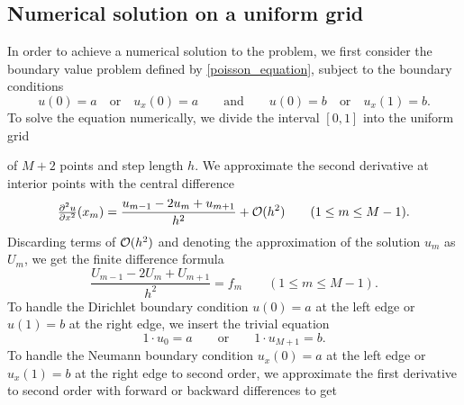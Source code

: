 \subsection{Numerical solution on a uniform grid}
In order to achieve a numerical solution to the problem, we first consider the boundary value problem defined by \cref{poisson_equation}, subject to the boundary conditions
\begin{equation*}
u(0) = a \quad \text{or} \quad u_x(0) = a \qquad \text{and} \qquad u(0) = b \quad \text{or} \quad u_x(1) = b.
\end{equation*}
To solve the equation numerically, we divide the interval $[0, 1]$ into the uniform grid 
\begin{center}
\end{center}
of $M+2$ points and step length $h$.
We approximate the second derivative at interior points with the central difference
\begin{equation*}
\pd[2]{u}{x}(x_m) = \frac{u_{m-1}-2u_{m}+u_{m+1}}{h^2} + \Oh(h^2) \qquad (1 \leq m \leq M-1).
\end{equation*}
Discarding terms of $\mathcal{O}(h^2)$ and denoting the approximation of the solution $u_m$ as $U_m$, 
we get the finite difference formula
\begin{equation}
\frac{U_{m-1}-2U_{m}+U_{m+1}}{h^2} = f_m \qquad (1 \leq m \leq M-1).
\label{eq:task1-finite-diff-approx}
\end{equation}
To handle the Dirichlet boundary condition $u(0) = a$ at the left edge or $u(1) = b$ at the right edge, we insert the trivial equation
\begin{equation*}
1 \cdot u_0 = a \qquad \text{or} \qquad 1 \cdot u_{M+1} = b.
\end{equation*}
To handle the Neumann boundary condition $u_x(0) = a$ at the left edge or $u_x(1) = b$ at the right edge to second order, we approximate the first derivative to second order with forward or backward differences to get
